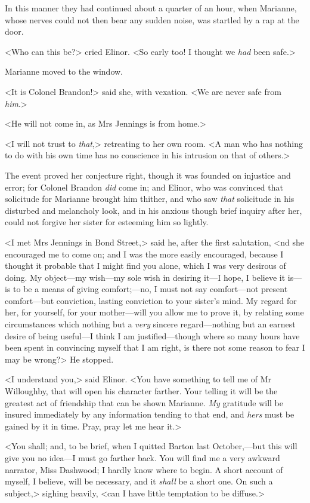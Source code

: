 In this manner they had continued about a quarter of an hour, when Marianne, whose nerves could not then bear any sudden noise, was startled by a rap at the door.

<Who can this be?> cried Elinor. <So early too! I thought we \textit{had} been safe.>

Marianne moved to the window.

<It is Colonel Brandon!> said she, with vexation. <We are never safe from \textit{him}.>

<He will not come in, as Mrs Jennings is from home.>

<I will not trust to \textit{that},> retreating to her own room. <A man who has nothing to do with his own time has no conscience in his intrusion on that of others.>

The event proved her conjecture right, though it was founded on injustice and error; for Colonel Brandon \textit{did} come in; and Elinor, who was convinced that solicitude for Marianne brought him thither, and who saw \textit{that} solicitude in his disturbed and melancholy look, and in his anxious though brief inquiry after her, could not forgive her sister for esteeming him so lightly.

<I met Mrs Jennings in Bond Street,> said he, after the first salutation, <nd she encouraged me to come on; and I was the more easily encouraged, because I thought it probable that I might find you alone, which I was very desirous of doing. My object—my wish—my sole wish in desiring it—I hope, I believe it is—is to be a means of giving comfort;—no, I must not say comfort—not present comfort—but conviction, lasting conviction to your sister's mind. My regard for her, for yourself, for your mother—will you allow me to prove it, by relating some circumstances which nothing but a \textit{very} sincere regard—nothing but an earnest desire of being useful—I think I am justified—though where so many hours have been spent in convincing myself that I am right, is there not some reason to fear I may be wrong?> He stopped.

<I understand you,> said Elinor. <You have something to tell me of Mr Willoughby, that will open his character farther. Your telling it will be the greatest act of friendship that can be shown Marianne. \textit{My} gratitude will be insured immediately by any information tending to that end, and \textit{hers} must be gained by it in time. Pray, pray let me hear it.>

<You shall; and, to be brief, when I quitted Barton last October,—but this will give you no idea—I must go farther back. You will find me a very awkward narrator, Miss Dashwood; I hardly know where to begin. A short account of myself, I believe, will be necessary, and it \textit{shall} be a short one. On such a subject,> sighing heavily, <can I have little temptation to be diffuse.>

